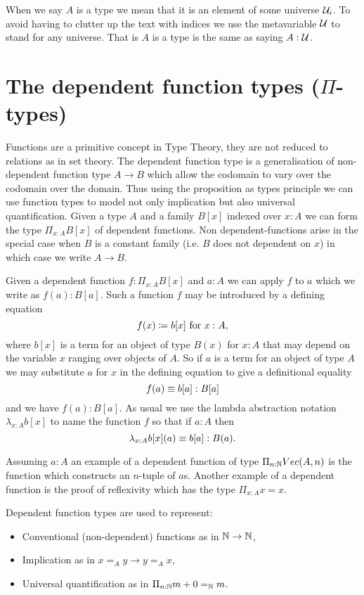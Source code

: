 {When we say $A$ is a type we mean that it is an element of some
universe ${\mathcal U}_i$. To avoid having to clutter up the text with indices
we use the metavariable ${\mathcal U}$ to stand for any universe. That is $A$
is a type is the same as saying $A : {\mathcal U}$.

\section{The dependent function types ($\Pi$-types)}

Functions are a primitive concept in Type Theory, they are not reduced
to relations as in set theory. The dependent function type is a
generalisation of non-dependent function type $A \to B$ which allow
the codomain to vary over the codomain over the domain. Thus using the
proposition as types principle we can use function types to model not
only implication but also universal quantification. Given a type $A$
and a family $B[x]$ indexed over $x:A$ we can form the type
$\Pi_{x:A}B[x]$ of dependent functions. Non dependent-functions arise
in the special case when $B$ is a constant family (i.e. $B$ does not
dependent on $x$) in which case we write $A \to B$.

Given a dependent function $f : \Pi_{x:A}B[x]$ and $a : A$ we can
apply $f$ to $a$ which we write as $f(a) : B[a]$.  Such a function $f$ may be introduced by a defining equation
  \[ f(x)\coloneqq b[x]\mbox{ for } x:A,\]
where $b[x]$ is a term for an object of type $B(x)$ for $x:A$ that may depend on the variable $x$ ranging over objects of $A$.  So if $a$ is a term for an object of type $A$ we may substitute $a$ for $x$ in the defining equation to give a definitional equality
  \[ f(a)\equiv b[a]:B[a]\]
and we have $f(a):B[a]$.  As usual we use the lambda abstraction notation 
$\lambda_{x:A}b[x]$ to name the function $f$ so that if $a:A$ then
  \[\lambda_{x:A}b[x](a)\equiv b[a]: B(a).\]

Assuming $a:A$ an example of a dependent function of type $\Pi_{n:\mathbb{N}}Vec(A,n)$
is the function which constructs an $n$-tuple of $a$s. Another example
of a dependent function is the proof of reflexivity which has the type
$\Pi_{x:A}x = x$.

Dependent function types are used to represent:
\begin{itemize}
\item Conventional (non-dependent) functions as in $\mathbb{N} \to \mathbb{N}$,
\item Implication as in $x =_A y \to y =_A x$,
\item Universal quantification as in $\Pi_{n:\mathbb{N}}m+0 =_\mathbb{N} m$.
\end{itemize}

}
